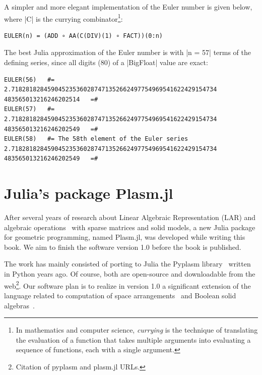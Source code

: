 \begin{script}
\vspace{5mm}
A simpler and more elegant implementation of the Euler number is given below, 
where |C| is the currying combinator\footnote{
In mathematics and computer science, \emph{currying} is the technique of translating the evaluation of a function that takes multiple arguments into evaluating a sequence of functions, each with a single argument.}:
\begin{lstlisting}[language=JuliaLocal, style=julia, mathescape = true]
    EULER(n) = (ADD ∘ AA(C(DIV)(1) ∘ FACT))(0:n)
\end{lstlisting}

The best Julia approximation of the Euler number is with |n = 57| terms of the defining series, since all  digits (80) of a |BigFloat| value are exact:

\begin{lstlisting}[language=JuliaLocal, style=julia, mathescape = true]
EULER(56)	#=
2.718281828459045235360287471352662497754969541622429154734
483565013216246202514	=#
EULER(57)	#=
2.718281828459045235360287471352662497754969541622429154734
483565013216246202549	=#
EULER(58)	#= The 58th element of the Euler series
2.718281828459045235360287471352662497754969541622429154734
483565013216246202549	=#
\end{lstlisting}



\section{Julia’s package Plasm.jl}\label{sect:2-4}



After several years of research about Linear Algebraic Representation (LAR) and algebraic operations~\cite{ieee-tase,DBLP:journals/cad/DiCarloPS14,TSAS:2020,PAOLUZZI2023103436} with sparse matrices and solid models, a new Julia package for geometric programming, named Plasm.jl, was developed while writing this book. We aim to finish the software version 1.0 before the book is published. 

The work has mainly consisted of porting to Julia the  Pyplasm library~\cite{pyplasm:2018} written in Python years ago. Of course, both are open-source and downloadable from the web\footnote{Citation of pyplasm and plasm.jl URLs.}. Our software plan is to realize in version 1.0 a significant extension of the language related to computation of space arrangements~\cite{TSAS:2020} and Boolean solid algebras~\cite{PAOLUZZI2023103436}.


\end{script}
